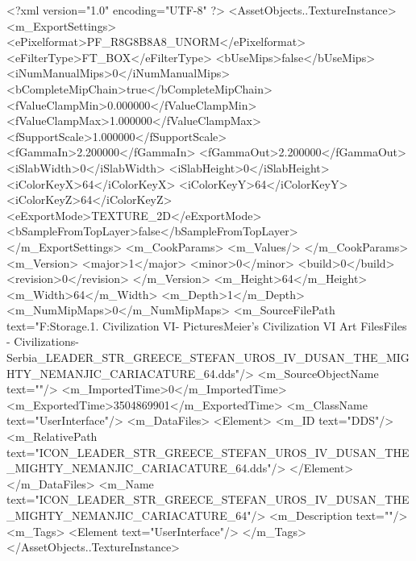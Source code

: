 <?xml version="1.0" encoding="UTF-8" ?>
<AssetObjects..TextureInstance>
	<m_ExportSettings>
		<ePixelformat>PF_R8G8B8A8_UNORM</ePixelformat>
		<eFilterType>FT_BOX</eFilterType>
		<bUseMips>false</bUseMips>
		<iNumManualMips>0</iNumManualMips>
		<bCompleteMipChain>true</bCompleteMipChain>
		<fValueClampMin>0.000000</fValueClampMin>
		<fValueClampMax>1.000000</fValueClampMax>
		<fSupportScale>1.000000</fSupportScale>
		<fGammaIn>2.200000</fGammaIn>
		<fGammaOut>2.200000</fGammaOut>
		<iSlabWidth>0</iSlabWidth>
		<iSlabHeight>0</iSlabHeight>
		<iColorKeyX>64</iColorKeyX>
		<iColorKeyY>64</iColorKeyY>
		<iColorKeyZ>64</iColorKeyZ>
		<eExportMode>TEXTURE_2D</eExportMode>
		<bSampleFromTopLayer>false</bSampleFromTopLayer>
	</m_ExportSettings>
	<m_CookParams>
		<m_Values/>
	</m_CookParams>
	<m_Version>
		<major>1</major>
		<minor>0</minor>
		<build>0</build>
		<revision>0</revision>
	</m_Version>
	<m_Height>64</m_Height>
	<m_Width>64</m_Width>
	<m_Depth>1</m_Depth>
	<m_NumMipMaps>0</m_NumMipMaps>
	<m_SourceFilePath text="F:\Mod Storage\2.1. Civilization VI\Mods\Archive - Pictures\Sid Meier's Civilization VI Art Files\Art Files - Civilizations\Civilization - Serbia\ICON_LEADER_STR_GREECE_STEFAN_UROS_IV_DUSAN_THE_MIGHTY_NEMANJIC_CARIACATURE_64.dds"/>
	<m_SourceObjectName text=""/>
	<m_ImportedTime>0</m_ImportedTime>
	<m_ExportedTime>3504869901</m_ExportedTime>
	<m_ClassName text="UserInterface"/>
	<m_DataFiles>
		<Element>
			<m_ID text="DDS"/>
			<m_RelativePath text="ICON_LEADER_STR_GREECE_STEFAN_UROS_IV_DUSAN_THE_MIGHTY_NEMANJIC_CARIACATURE_64.dds"/>
		</Element>
	</m_DataFiles>
	<m_Name text="ICON_LEADER_STR_GREECE_STEFAN_UROS_IV_DUSAN_THE_MIGHTY_NEMANJIC_CARIACATURE_64"/>
	<m_Description text=""/>
	<m_Tags>
		<Element text="UserInterface"/>
	</m_Tags>
</AssetObjects..TextureInstance>

